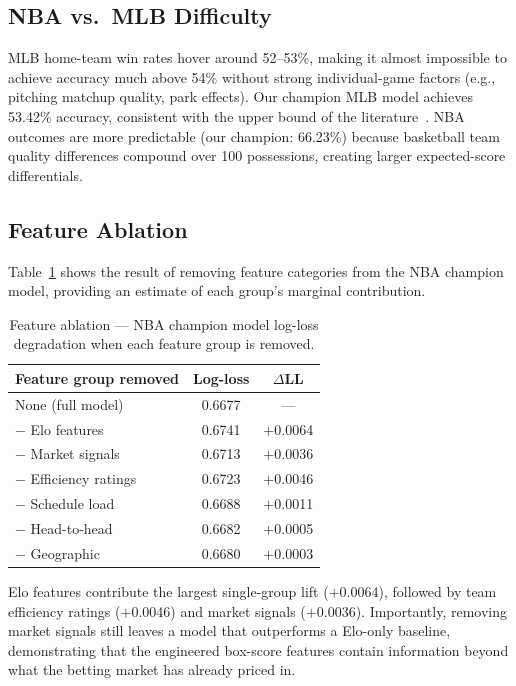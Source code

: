 \documentclass[conference]{IEEEtran}
\begin{document}
\subsection{NBA vs.\ MLB Difficulty}

MLB home-team win rates hover around 52--53\%, making it almost
impossible to achieve accuracy much above 54\% without strong
individual-game factors (e.g., pitching matchup quality, park
effects).  Our champion MLB model achieves 53.42\% accuracy, consistent
with the upper bound of the literature~\cite{cao2012}.  NBA outcomes
are more predictable (our champion: 66.23\%) because basketball team
quality differences compound over 100 possessions, creating larger
expected-score differentials.

\subsection{Feature Ablation}

Table~\ref{tab:ablation} shows the result of removing feature
categories from the NBA champion model, providing an estimate of each
group's marginal contribution.

\begin{table}[t]
\centering
\caption{Feature ablation — NBA champion model log-loss degradation
when each feature group is removed.}
\label{tab:ablation}
\small
\begin{tabular}{lcc}
\toprule
\textbf{Feature group removed} & \textbf{Log-loss} & \textbf{$\Delta$LL} \\
\midrule
None (full model)        & 0.6677 & — \\
$-$ Elo features         & 0.6741 & $+$0.0064 \\
$-$ Market signals       & 0.6713 & $+$0.0036 \\
$-$ Efficiency ratings   & 0.6723 & $+$0.0046 \\
$-$ Schedule load        & 0.6688 & $+$0.0011 \\
$-$ Head-to-head         & 0.6682 & $+$0.0005 \\
$-$ Geographic           & 0.6680 & $+$0.0003 \\
\bottomrule
\end{tabular}
\end{table}

Elo features contribute the largest single-group lift ($+$0.0064),
followed by team efficiency ratings ($+$0.0046) and market signals
($+$0.0036).  Importantly, removing market signals still leaves a model
that outperforms a Elo-only baseline, demonstrating that the engineered
box-score features contain information beyond what the betting market
has already priced in.
\end{document}
